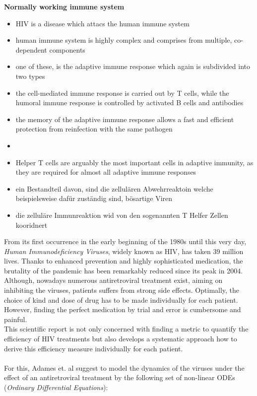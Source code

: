 \textbf{Normally working immune system}
\begin{itemize}
    \item HIV is a disease which attacs the human immune system
    \item human immune system is highly complex and comprises from multiple, co-dependent components
    \item one of these, is the adaptive immune response which again is subdivided into two types
    \item the cell-mediated immune response is carried out by T cells, while the humoral immune response
     is controlled by activated B cells and antibodies
    \item the memory of the adaptive immune response allows a fast and efficient protection from reinfection with the same pathogen
    \item 
    \item Helper T cells are arguably the most important cells in adaptive immunity, 
    as they are required for almost all adaptive immune responses
    \item ein Bestandteil davon, sind die zellulären Abwehrreaktoin welche beispielsweise 
    dafür zuständig sind, bösartige Viren 
    \item die zelluläre Immunreaktion wid von den sogenannten T Helfer Zellen kooridnert 
\end{itemize}



From its first occurrence in the early beginning of the 1980s until this very day, \textit{Human Immunodeficiency Viruses}, widely known as HIV, has taken 39 million lives.
Thanks to enhanced prevention and highly sophisticated medication, the brutality of the pandemic has been remarkably reduced since its peak in 2004.
Although, nowadays numerous antiretroviral treatment exist, aiming on inhibiting the viruses, patients suffers from strong side effects.
Optimally, the choice of kind and dose of drug has to be made individually for each patient.
However, finding the perfect medication by trial and error is cumbersome and painful.\\
This scientific report is not only concerned with finding a metric to quantify the efficiency of HIV treatments but also develops a systematic approach how to derive this efficiency measure individually for each patient.\\ \\
For this, Adames et. al \cite{ADAMS200510} suggest to model the dynamics of the viruses under the effect of an antiretroviral treatment by the following set of non-linear ODEs (\textit{Ordinary Differential Equations}): 

